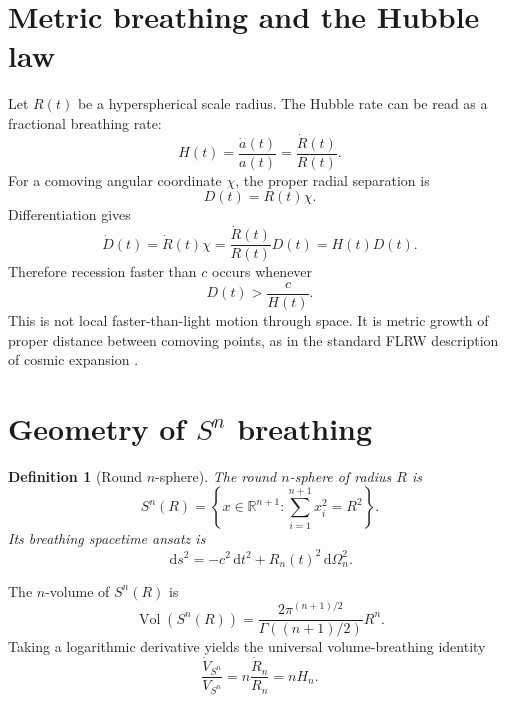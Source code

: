 \documentclass[11pt]{article}
\newtheorem{definition}{Definition}
\newcommand{\dd}{\,\mathrm{d}}
\newcommand{\Vol}{\operatorname{Vol}}
\begin{document}
\section{Metric breathing and the Hubble law}

Let $R(t)$ be a hyperspherical scale radius.  The Hubble rate can be read as a fractional breathing rate:
\begin{equation}
 H(t)=\frac{\dot a(t)}{a(t)}=\frac{\dot R(t)}{R(t)}.
 \label{eq:hubble-breathing}
\end{equation}
For a comoving angular coordinate $\chi$, the proper radial separation is
\begin{equation}
 D(t)=R(t)\chi.
\end{equation}
Differentiation gives
\begin{equation}
 \dot D(t)=\dot R(t)\chi=\frac{\dot R(t)}{R(t)}D(t)=H(t)D(t).
\end{equation}
Therefore recession faster than $c$ occurs whenever
\begin{equation}
 \boxed{D(t)>\frac{c}{H(t)}}.
 \label{eq:hubble-radius-condition}
\end{equation}
This is not local faster-than-light motion through space.  It is metric growth of proper distance between comoving points, as in the standard FLRW description of cosmic expansion \citep{Mukhanov2005,Weinberg2008}.

\section{\texorpdfstring{Geometry of $S^n$ breathing}{Geometry of Sn breathing}}

\begin{definition}[Round $n$-sphere]
The round $n$-sphere of radius $R$ is
\begin{equation}
 S^n(R)=\left\{x\in\mathbb{R}^{n+1}:\sum_{i=1}^{n+1}x_i^2=R^2\right\}.
\end{equation}
Its breathing spacetime ansatz is
\begin{equation}
 \dd s^2=-c^2\dd t^2+R_n(t)^2\dd\Omega_n^2.
 \label{eq:sn-metric}
\end{equation}
\end{definition}

The $n$-volume of $S^n(R)$ is
\begin{equation}
 \Vol(S^n(R))=\frac{2\pi^{(n+1)/2}}{\Gamma((n+1)/2)}R^n.
 \label{eq:sn-volume-general}
\end{equation}
Taking a logarithmic derivative yields the universal volume-breathing identity
\begin{equation}
 \boxed{\frac{\dot V_{S^n}}{V_{S^n}}=n\frac{\dot R_n}{R_n}=nH_n.}
 \label{eq:volume-breathing}
\end{equation}
\end{document}
